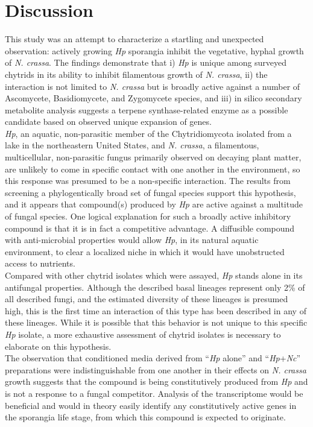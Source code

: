 \section{Discussion}
This study was an attempt to characterize a startling and unexpected observation: actively growing \textit{Hp} sporangia inhibit the vegetative, hyphal growth of \textit{N. crassa}. The findings demonstrate that i) \textit{Hp} is unique among surveyed chytrids in its ability to inhibit filamentous growth of \textit{N. crassa}, ii) the interaction is not limited to \textit{N. crassa} but is broadly active against a number of Ascomycete, Basidiomycete, and Zygomycete species, and iii) in silico secondary metabolite analysis suggests a terpene synthase-related enzyme as a possible candidate based on observed unique expansion of genes.\\
\indent \textit{Hp}, an aquatic, non-parasitic member of the Chytridiomycota isolated from a lake in the northeastern United States, and \textit{N. crassa}, a filamentous, multicellular, non-parasitic fungus primarily observed on decaying plant matter, are unlikely to come in specific contact with one another in the environment, so this response was presumed to be a non-specific interaction. The results from screening a phylogentically broad set of fungal species support this hypothesis, and it appears that compound(s) produced by \textit{Hp} are active against a multitude of fungal species. One logical explanation for such a broadly active inhibitory compound is that it is in fact a competitive advantage. A diffusible compound with anti-microbial properties would allow \textit{Hp}, in its natural aquatic environment, to clear a localized niche in which it would have unobstructed access to nutrients.\\
\indent Compared with other chytrid isolates which were assayed, \textit{Hp} stands alone in its antifungal properties. Although the described basal lineages represent only 2\% of all described fungi, and the estimated diversity of these lineages is presumed high, this is the first time an interaction of this type has been described in any of these lineages. While it is possible that this behavior is not unique to this specific \textit{Hp} isolate, a more exhaustive assessment of chytrid isolates is necessary to elaborate on this hypothesis.\\
\indent The observation that conditioned media derived from \enquote{\textit{Hp} alone} and \enquote{\textit{Hp}+\textit{Nc}} preparations were indistinguishable from one another in their effects on \textit{N. crassa} growth suggests that the compound is being constitutively produced from \textit{Hp} and is not a response to a fungal competitor. Analysis of the transcriptome would be beneficial and would in theory easily identify any constitutively active genes in the sporangia life stage, from which this compound is expected to originate.\\
